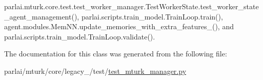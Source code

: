 parlai.\+mturk.\+core.\+test.\+test\+\_\+worker\+\_\+manager.\+Test\+Worker\+State.\+test\+\_\+worker\+\_\+state\+\_\+agent\+\_\+management(), parlai.\+scripts.\+train\+\_\+model.\+Train\+Loop.\+train(), agent.\+modules.\+Mem\+N\+N.\+update\+\_\+memories\+\_\+with\+\_\+extra\+\_\+features\+\_\+(), and parlai.\+scripts.\+train\+\_\+model.\+Train\+Loop.\+validate().



The documentation for this class was generated from the following file\+:\begin{DoxyCompactItemize}
\item 
parlai/mturk/core/legacy\+\_/test/\hyperlink{legacy__2018_2test_2test__mturk__manager_8py}{test\+\_\+mturk\+\_\+manager.\+py}\end{DoxyCompactItemize}
